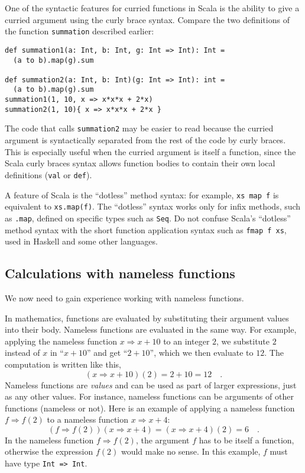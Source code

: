 One of the syntactic features for curried functions in Scala is the
ability to give a curried argument using the curly brace syntax. Compare
the two definitions of the function \lstinline!summation! described
earlier:
\begin{lstlisting}
def summation1(a: Int, b: Int, g: Int => Int): Int =
  (a to b).map(g).sum

def summation2(a: Int, b: Int)(g: Int => Int): int =
  (a to b).map(g).sum
summation1(1, 10, x => x*x*x + 2*x)
summation2(1, 10){ x => x*x*x + 2*x }
\end{lstlisting}

The code that calls \lstinline!summation2! may be easier to read
because the curried argument is syntactically separated from the rest
of the code by curly braces. This is especially useful when the curried
argument is itself a function, since the Scala curly braces syntax
allows function bodies to contain their own local definitions (\lstinline!val!
or \lstinline!def!).

A feature of Scala is the ``dotless'' method syntax: for example,
\lstinline!xs map f! is equivalent to \lstinline!xs.map(f)!. The
``dotless'' syntax works only for infix methods, such as \lstinline!.map!,
defined on specific types such as \lstinline!Seq!. Do not confuse
Scala's ``dotless'' method syntax with the short function application
syntax such as \lstinline!fmap f xs!, used in Haskell and some other
languages.

\subsection{Calculations with nameless functions}

We now need to gain experience working with nameless functions.

In mathematics, functions are evaluated by substituting their argument
values into their body. Nameless functions are evaluated in the same
way. For example, applying the nameless function $x\Rightarrow x+10$
to an integer $2$, we substitute $2$ instead of $x$ in \textquotedblleft $x+10$\textquotedblright{}
and get \textquotedblleft $2+10$\textquotedblright , which we then
evaluate to $12$. The computation is written like this, 
\[
(x\Rightarrow x+10)(2)=2+10=12\quad.
\]
Nameless functions are \emph{values} and can be used as part of larger
expressions, just as any other values. For instance, nameless functions
can be arguments of other functions (nameless or not). Here is an
example of applying a nameless function $f\Rightarrow f(2)$ to a
nameless function $x\Rightarrow x+4$:
\[
\left(f\Rightarrow f(2)\right)(x\Rightarrow x+4)=(x\Rightarrow x+4)(2)=6\quad.
\]
In the nameless function $f\Rightarrow f(2)$, the argument $f$ has
to be itself a function, otherwise the expression $f(2)$ would make
no sense. In this example, $f$ must have type \lstinline!Int => Int!.

